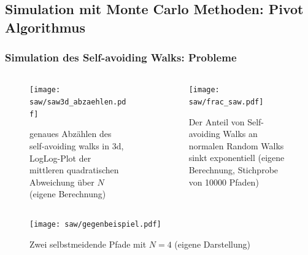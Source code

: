 \documentclass{beamer}
\begin{document}
\subsection{Simulation mit Monte Carlo Methoden: Pivot Algorithmus}
\begin{frame}
	\frametitle{Simulation des Self-avoiding Walks: Probleme}
	\begin{columns}[t]
		\begin{column}{0.5\textwidth}
			\begin{figure}
				\centering
				\texttt{[image: saw/saw3d\_abzaehlen.pdf]}
				\caption{genaues Abzählen des self-avoiding walks in 3d, LogLog-Plot der mittleren quadratischen Abweichung über $N$ (eigene Berechnung)}
			\end{figure}
		\end{column}
		\begin{column}{0.5\textwidth}
			\begin{figure}
				\centering
				\texttt{[image: saw/frac\_saw.pdf]}
				\caption{Der Anteil von Self-avoiding Walks an normalen Random Walks sinkt exponentiell (eigene Berechnung, Stichprobe von 10000 Pfaden)}
			\end{figure}
		\end{column}
	\end{columns}
	\begin{figure}
		\begin{minipage}[t]{.5\textwidth}
			\raggedleft
			\vspace*{-0.5cm}
			\texttt{[image: saw/gegenbeispiel.pdf]}
		\end{minipage}\hfill
		\begin{minipage}[t]{.5\textwidth}
			\vspace{0pt}
			\caption{Zwei selbstmeidende Pfade mit $N=4$ (eigene Darstellung)}
		\end{minipage}
	\end{figure}
\end{frame}
\end{document}
